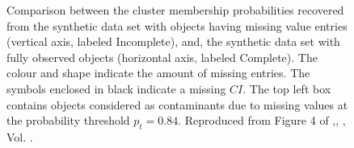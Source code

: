 \begin{figure}[!htp]
\begin{center}
\caption{Comparison between the cluster membership probabilities recovered from the synthetic data set with objects having missing value entries (vertical axis, labeled Incomplete), and, the synthetic data set with fully observed objects (horizontal axis, labeled Complete). The colour and shape indicate the amount of missing entries. The symbols enclosed in black indicate a missing $CI$. The top left box contains objects considered as contaminants due to missing values at the probability threshold $p_t=0.84$. Reproduced from Figure 4 of \citet{Olivares2017},\textit{}, , Vol. .}
\label{figure:IncVsCom}
\end{center}
\end{figure}

